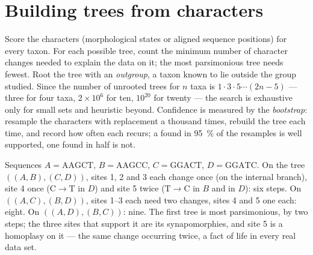 \section{Building trees from characters}

\begin{method}[Parsimony]\label{meth:b2:phylogenetic-trees:parsimony}
Score the characters (morphological states or aligned sequence
positions) for every taxon. For each possible tree, count the
minimum number of character changes needed to explain the data on
it; the most parsimonious tree needs fewest. Root the tree with an
\emph{outgroup}, a taxon known to lie outside the group studied.
Since the number of unrooted trees for $n$ taxa is $1\cdot 3\cdot
5\cdots(2n - 5)$ --- three for four taxa, $2\times 10^{6}$ for ten,
$10^{20}$ for twenty --- the search is exhaustive only for small
sets and heuristic beyond. Confidence is measured by the
\emph{bootstrap}: resample the characters with replacement a
thousand times, rebuild the tree each time, and record how often
each  recurs; a  found in \qty{95}{\%} of the resamples is
well supported, one found in half is not.
\end{method}

\begin{example}\label{ex:b2:phylogenetic-trees:parsimony}
Sequences $A = \mathrm{AAGCT}$, $B = \mathrm{AAGCC}$, $C =
\mathrm{GGACT}$, $D = \mathrm{GGATC}$. On the tree $((A,B),(C,D))$,
sites 1, 2 and 3 each change once (on the internal branch), site 4
once ($\mathrm{C}\to\mathrm{T}$ in $D$) and site 5 twice
($\mathrm{T}\to\mathrm{C}$ in $B$ and in $D$): six steps. On
$((A,C),(B,D))$, sites 1--3 each need two changes, sites 4 and 5
one each: eight. On $((A,D),(B,C))$: nine. The first tree is most
parsimonious, by two steps; the three sites that support it are
its synapomorphies, and site 5 is a homoplasy on it --- the same
change occurring twice, a fact of life in every real data set.
\end{example}

